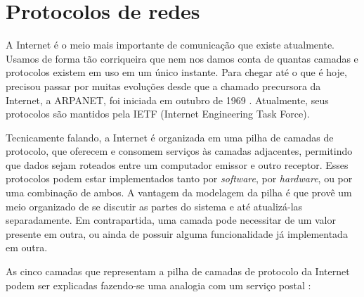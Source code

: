 
\section{Protocolos de redes}

A Internet é o meio mais importante de comunicação que existe atualmente. Usamos de
forma tão corriqueira que nem nos damos conta de quantas camadas e protocolos existem em
uso em um único instante. Para chegar até o que é hoje, precisou passar por muitas
evoluções desde que a chamado precursora da Internet, a ARPANET, foi iniciada em outubro
de 1969 \cite{book:kurose}. Atualmente, seus protocolos são mantidos pela IETF
(Internet Engineering Task Force).

Tecnicamente falando, a Internet é organizada em uma pilha de camadas de protocolo, que
oferecem e consomem serviços às camadas adjacentes, permitindo que dados sejam roteados
entre um computador emissor e outro receptor. Esses protocolos podem estar implementados
tanto por \emph{software}, por \emph{hardware}, ou por uma combinação de ambos. A
vantagem da modelagem da pilha é que provê um meio organizado de se discutir as partes
do sistema e até atualizá-las separadamente. Em contrapartida, uma camada pode
necessitar de um valor presente em outra, ou ainda de possuir alguma funcionalidade já
implementada em outra.

As cinco camadas que representam a pilha de camadas de protocolo da Internet podem ser
explicadas fazendo-se uma analogia com um serviço postal \cite{site:internet-layer}:

